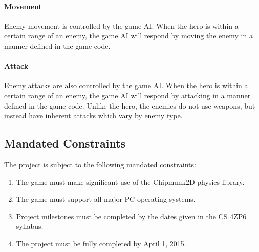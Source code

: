 \documentclass[12pt, titlepage]{article}
\begin{document}
\paragraph{Movement}
Enemy movement is controlled by the game AI.  When the hero is within a certain range of an enemy, the game AI will respond by moving the enemy in a manner defined in the game code.

\paragraph{Attack}
Enemy attacks are also controlled by the game AI.  When the hero is within a certain range of an enemy, the game AI will respond by attacking in a manner defined in the game code.  Unlike the hero, the enemies do not use weapons, but instead have inherent attacks which vary by enemy type.



\subsection{Mandated Constraints}

The project is subject to the following mandated constraints:

\begin{enumerate}
  \item The game must make significant use of the Chipmunk2D physics library.
  \item The game must support all major PC operating systems.
  \item Project milestones must be completed by the dates given in the CS 4ZP6 syllabus.
  \item The project must be fully completed by April 1, 2015.
\end{enumerate}
\end{document}
